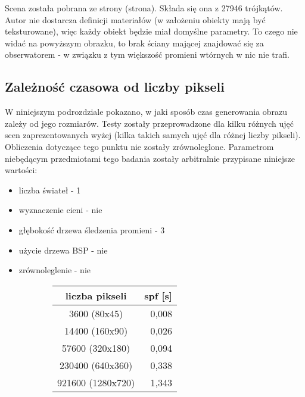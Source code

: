 Scena została pobrana ze strony (strona). Składa się ona z 27946 trójkątów. Autor nie dostarcza definicji materiałów (w założeniu obiekty mają być teksturowane), więc każdy obiekt będzie miał domyślne parametry. To czego nie widać na powyższym obrazku, to brak ściany mającej znajdować się za obserwatorem - w związku z tym większość promieni wtórnych w nic nie trafi.


\subsection{Zależność czasowa od liczby pikseli}

W niniejszym podrozdziale pokazano, w jaki sposób czas generowania obrazu zależy od jego rozmiarów. Testy zostały przeprowadzone dla kilku różnych ujęć scen zaprezentowanych wyżej (kilka takich samych ujęć dla różnej liczby pikseli). Obliczenia dotyczące tego punktu nie zostały zrównoleglone. Parametrom niebędącym przedmiotami tego badania zostały arbitralnie przypisane niniejsze wartości:

\begin{itemize}

\item liczba świateł - 1
\item wyznaczenie cieni - nie
\item głębokość drzewa śledzenia promieni - 3
\item użycie drzewa BSP - nie
\item zrównoleglenie - nie

\end{itemize}

\begin{figure}[!htb]
\advance\leftskip-2cm
\begin{subfigure}{.5\textwidth}
\end{subfigure}
\hspace{2cm}
\begin{subfigure}{.5\textwidth}
		\begin{longtable}{|c|r|} \hline
	    liczba pikseli & \multicolumn{1}{|c|}{spf [s]} \\ \hline
	    3600 (80x45) & 0,008 \\ 
	    14400 (160x90) & 0,026 \\
		57600 (320x180) & 0,094 \\
		230400 (640x360) & 0,338 \\
		921600 (1280x720) & 1,343 \\
		\hline
		\end{longtable}
\end{subfigure}
\end{figure}

